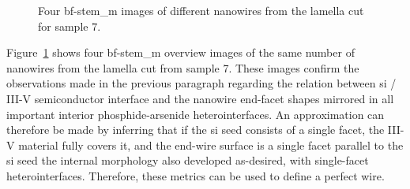 \begin{figure}
    \centering
    \caption[Four \acs{bf}-\acs{stem_m} images of different nanowires from the lamella cut for sample 7.]{Four \acs{bf}-\acs{stem_m} images of different nanowires from the lamella cut for sample 7.}
    \label{fig:s7_OVs}
\end{figure}

Figure~\ref{fig:s7_OVs} shows four \acs{bf}-\acs{stem_m} overview images of the same number of nanowires from the lamella cut from sample 7. These images confirm the observations made in the previous paragraph regarding the relation between \acf{si} / III-V semiconductor interface and the nanowire end-facet shapes mirrored in all important interior phosphide-arsenide heterointerfaces. An approximation can therefore be made by inferring that if the \acl{si} seed consists of a single  facet, the III-V material fully covers it, and the end-wire surface is a single  facet parallel to the \acs{si} seed the internal morphology also developed as-desired, with  single-facet heterointerfaces. Therefore, these metrics can be used to define a perfect wire.

